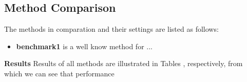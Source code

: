 
\subsection{Method Comparison}



The methods in comparation and their settings are listed as
follows:

\begin{itemize}
\item \textbf{benchmark1}
%
is a well know method for ...

\end{itemize}

\textbf{Results}
%
Results of all methods are illustrated in Tables \missref , respectively,
from which we can see that performance
